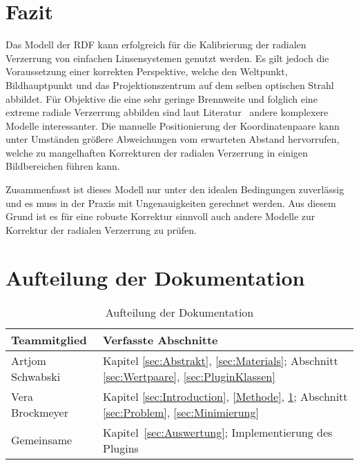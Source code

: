 \section{Fazit} \label{sec:Conclusion}
Das Modell der RDF kann erfolgreich für die Kalibrierung der radialen Verzerrung von einfachen Linsensystemen genutzt werden. Es gilt jedoch die Voraussetzung einer korrekten Perspektive, welche den Weltpunkt, Bildhauptpunkt und das Projektionszentrum auf dem selben optischen Strahl abbildet. Für Objektive die eine sehr geringe Brennweite und folglich eine extreme radiale Verzerrung abbilden sind laut Literatur~\cite{WangRaddist} andere komplexere Modelle interessanter. Die manuelle Positionierung der Koordinatenpaare kann unter Umständen größere Abweichungen vom erwarteten Abstand hervorrufen, welche zu mangelhaften Korrekturen der radialen Verzerrung in einigen Bildbereichen führen kann. 

Zusammenfasst ist dieses Modell nur unter den idealen Bedingungen zuverlässig und es muss in der Praxis mit Ungenauigkeiten gerechnet werden. Aus diesem Grund ist es für eine robuste Korrektur sinnvoll auch andere Modelle zur Korrektur der radialen Verzerrung zu prüfen.
\section{Aufteilung der Dokumentation}
\begin{table}[H]
		\begin{tabular}{|p{} | p{}|} 
			\hline
			\textbf{Teammitglied} & \textbf{Verfasste Abschnitte}\\ \hline
			Artjom Schwabski& Kapitel \ref{sec:Abstrakt}, \ref{sec:Materials}; Abschnitt \ref{sec:Wertpaare}, \ref{sec:PluginKlassen} \\ \hline
			Vera Brockmeyer & Kapitel \ref{sec:Introduction}, \ref{Methode}, \ref{sec:Conclusion}; Abschnitt \ref{sec:Problem}, \ref{sec:Minimierung} \\ \hline
			Gemeinsame & Kapitel~\ref{sec:Auswertung}; Implementierung des Plugins\\ \hline
		\end{tabular}
		\caption{Aufteilung der Dokumentation}
\end{table}


























